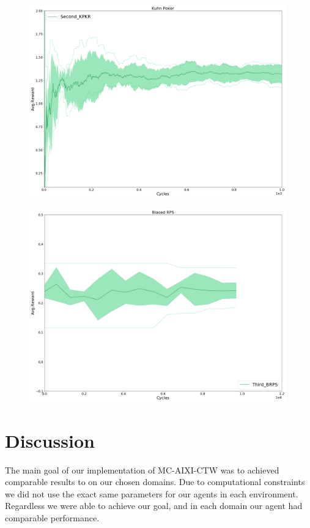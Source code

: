\documentclass{article}
\theoremstyle{definition}
\newtheorem{primary statistics}[definition]{Primary Statistics}
\newtheorem{auxiliary statistics}[definition]{Auxiliary Statistics}
\begin{document}
\begin{figure}[!htb]
 \centering
    \includegraphics[width=11.1cm]{Second_KPKR}
\end{figure}

\begin{figure}[!htb]
 \centering
    \includegraphics[width=11.1cm]{Third_BRPS}
\end{figure}


\newpage
\hspace{3cm}

\section{Discussion}


The main goal of our implementation of MC-AIXI-CTW was to achieved comparable results to \citep{veness2011monte} on our chosen domains. Due to computational constraints we did not use the exact same parameters for our agents in each environment. Regardless we were able to achieve our goal, and in each domain our agent had comparable performance. \\
\end{document}
